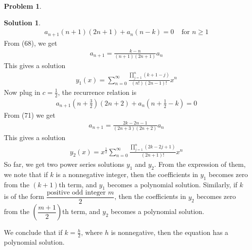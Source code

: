 \documentclass[a4paper]{article}
\theoremstyle{definition}
\newtheorem{Problem}{Problem}
\newtheorem*{Solution}{Solution}
\begin{document}
\begin{Problem}
\begin{Solution}
\begin{align}
    a_{n+1} (n+1)(2n+1)+a_{n}{(n-k)}=0 & \text{ for }n\ge 1
\end{align}
From (68), we get 
\begin{align}
    a_{n+1} = \frac{k-n}{(n+1)(2n+1)}a_{n}
\end{align}
This gives a solution
\begin{align}
    y_{1}(x) = \sum_{n=0}^{\infty} \frac{\prod_{j=1}^{n}(k+1-j)}{(n!)(2n-1)!}x^{n}
\end{align}
Now plug in $c=\frac{1}{2}$, the recurrence relation is 
\begin{align}
    a_{n+1}\left(n+\frac{3}{2}\right)\left(2n+2\right)+a_{n}\left(n+\frac12-k\right)=0
\end{align}
From (71) we get
\begin{align}
    a_{n+1} = \frac{2k-2n-1}{(2n+3)(2n+2)}a_{n} 
\end{align}
This gives a solution
\begin{align}
    y_{2}(x) = x^{\frac{1}{2}}\sum_{n=0}^{\infty} \frac{\prod_{j=1}^{n} (2k-2j+1)}{(2n+1)!}x^{n}
\end{align}
So far, we get two power series solutions $y_1$ and $y_2$. 
From the expression of them, we note that if $k$ is a nonnegative integer, then the coefficients in $y_{1}$ becomes zero from the $(k+1)$th term, and $y_{1}$ becomes a polynomial solution.
Similarly, if $k$ is of the form $\dfrac{\text{positive odd integer } m}{2}$, then the coefficients in $y_{2}$ becomes zero from the $\left(\dfrac{m+1}{2}\right)$th term, and $y_2$ becomes a polynomial solution.

We conclude that if $k=\frac{h}{2}$, where $h$ is nonnegative, then the equation has a polynomial solution.


\end{Solution}


\end{Problem}
\end{document}
